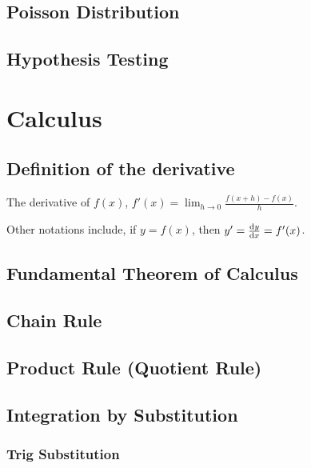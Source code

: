 \documentclass[a4paper,11pt]{article}
\begin{document}
    \subsection{Poisson Distribution}


    \subsection{Hypothesis Testing}


    \section{Calculus}


    \subsection{Definition of the derivative}

    The derivative of $f(x)$,
    $\displaystyle f'(x) = \lim_{h \to 0} \frac{f(x + h) - f(x)}{h}$.

    Other notations include, if $y = f(x)$, then
    $y' = \dv{y}{x} = f'(x)$.

    \subsection{Fundamental Theorem of Calculus} \label{sec:calc_FTC}

    \subsection{Chain Rule} \label{sec:calc_chain}

    \subsection{Product Rule (Quotient Rule)} \label{sec:calc_product}

    \subsection{Integration by Substitution} \label{sec:calc_substitution}

    \subsubsection{Trig Substitution} \label{sec:calc_trig_substitution}
\end{document}
